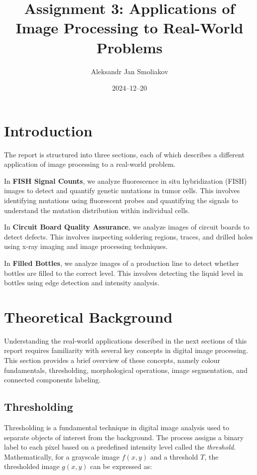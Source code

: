 \documentclass[a4paper,12pt]{article}
\title{Assignment 3: Applications of Image Processing to Real-World Problems}
\author{Aleksandr Jan Smoliakov}
\date{2024--12--20}
\begin{document}
\maketitle

\section{Introduction}

The report is structured into three sections, each of which describes a different application of image processing to a real-world problem.

In \textbf{FISH Signal Counts}, we analyze fluorescence in situ hybridization (FISH) images to detect and quantify genetic mutations in tumor cells. This involves identifying mutations using fluorescent probes and quantifying the signals to understand the mutation distribution within individual cells.

In \textbf{Circuit Board Quality Assurance}, we analyze images of circuit boards to detect defects. This involves inspecting soldering regions, traces, and drilled holes using x-ray imaging and image processing techniques.

In \textbf{Filled Bottles}, we analyze images of a production line to detect whether bottles are filled to the correct level. This involves detecting the liquid level in bottles using edge detection and intensity analysis.

\newpage

\tableofcontents

\newpage

\section{Theoretical Background}

Understanding the real-world applications described in the next sections of this report requires familiarity with several key concepts in digital image processing. This section provides a brief overview of these concepts, namely colour fundamentals, thresholding, morphological operations, image segmentation, and connected components labeling.

\subsection{Thresholding}

Thresholding is a fundamental technique in digital image analysis used to separate objects of interest from the background. The process assigns a binary label to each pixel based on a predefined intensity level called the \emph{threshold}. Mathematically, for a grayscale image \(f(x, y)\) and a threshold \(T\), the thresholded image \(g(x, y)\) can be expressed as:
\end{document}
